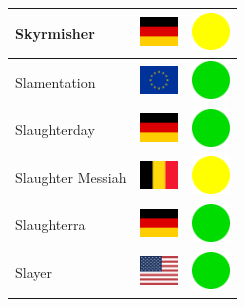 \documentclass[12pt, a4paper, twoside]{report}
\begin{document}
\begin{center}
\begin{longtable}{|p{5cm}|p{2cm}|p{2cm}|}
 Skyrmisher                                                 & \includegraphics[width=1cm]{../img/flags/de} &   \includegraphics[width=1cm]{../likes/m} \\ \hline
 Slamentation                                               & \includegraphics[width=1cm]{../img/flags/eu} &   \includegraphics[width=1cm]{../likes/y} \\ \hline
 Slaughterday                                               & \includegraphics[width=1cm]{../img/flags/de} &   \includegraphics[width=1cm]{../likes/y} \\ \hline
 Slaughter Messiah                                          & \includegraphics[width=1cm]{../img/flags/be} &   \includegraphics[width=1cm]{../likes/m} \\ \hline
 Slaughterra                                                & \includegraphics[width=1cm]{../img/flags/de} &   \includegraphics[width=1cm]{../likes/y} \\ \hline
 Slayer                                                     & \includegraphics[width=1cm]{../img/flags/us} &   \includegraphics[width=1cm]{../likes/y} \\ \hline

\end{longtable}
\end{center}
\end{document}
